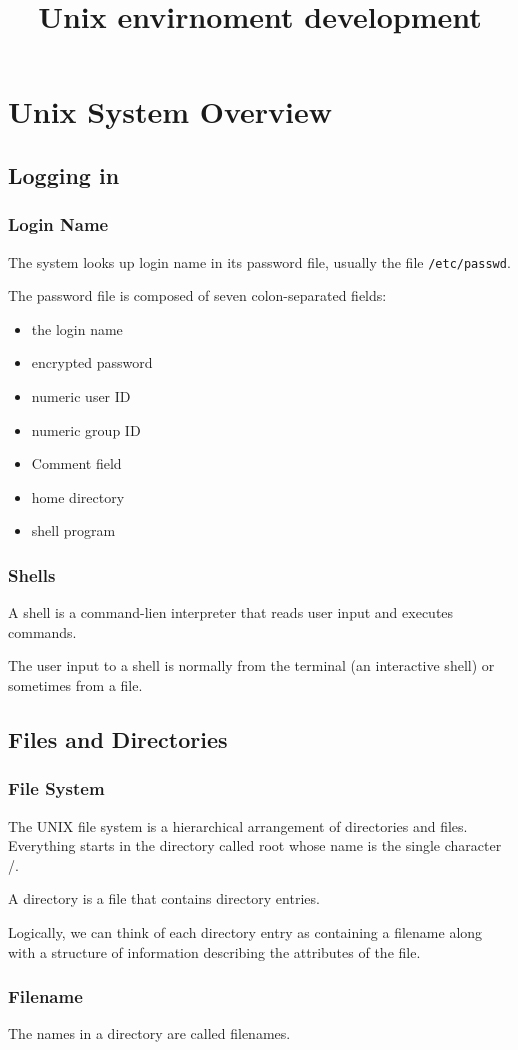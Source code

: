 \documentclass[a4paper,11pt]{book}
\title{Unix envirnoment development}
\begin{document}
\chapter{Unix System Overview}
\section{Logging in}
\subsection{Login Name}
The system looks up login name in its password file, usually the file
\verb|/etc/passwd|.

The password file is composed of seven colon-separated fields:
\begin{itemize}
\item the login name
\item encrypted password
\item numeric user ID
\item numeric group ID
\item Comment field
\item home directory
\item shell program
\end{itemize}
\subsection{Shells}
A shell is a command-lien interpreter that reads user input and executes
commands.

The user input to a shell is normally from the terminal (an interactive shell)
or sometimes from a file.
\section{Files and Directories}
\subsection{File System}
The UNIX file system is a hierarchical arrangement of directories and files.
Everything starts in the directory called root whose name is the single
character /.

A directory is a file that contains directory entries.

Logically, we can think of each directory entry as containing a filename along
with a structure of information describing the attributes of the file. 

\subsection{Filename}
The names in a directory are called filenames.
\end{document}
